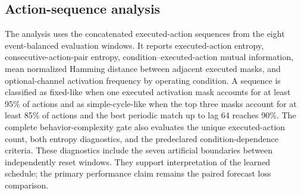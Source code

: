 \subsection{Action-sequence analysis}

The analysis uses the concatenated executed-action sequences from the eight
event-balanced evaluation windows. It reports executed-action entropy,
consecutive-action-pair entropy, condition--executed-action mutual information,
mean normalized Hamming distance between adjacent executed masks, and optional-channel
activation frequency by operating condition. A sequence is classified as fixed-like when
one executed activation mask accounts for at least 95\% of actions and as simple-cycle-like
when the top three masks account for at least 85\% of actions and the best periodic match
up to lag 64 reaches 90\%. The complete behavior-complexity gate also evaluates the
unique executed-action count, both entropy diagnostics, and the predeclared
condition-dependence criteria. These diagnostics include the seven artificial boundaries
between independently reset windows. They support interpretation of the learned schedule; the primary performance
claim remains the paired forecast loss comparison.

